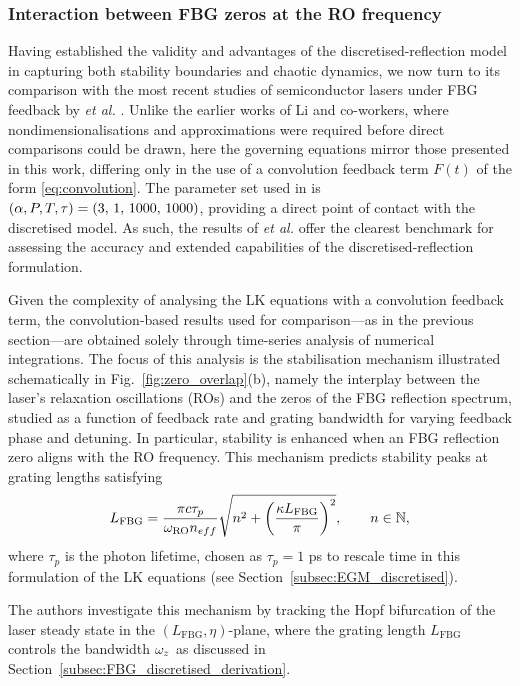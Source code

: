 \subsubsection{Interaction between FBG zeros at the RO frequency}
\label{subsubsec:skenderas}
%
Having established the validity and advantages of the discretised-reflection model in capturing both stability boundaries and chaotic dynamics, we now turn to its comparison with the most recent studies of semiconductor lasers under FBG feedback by \Skenderas \textit{et al.} \cite{skenderas2021feedback,skenderas2024impact}.
Unlike the earlier works of Li and co-workers, where nondimensionalisations and approximations were required before direct comparisons could be drawn, here the governing equations mirror those presented in this work, differing only in the use of a convolution feedback term $F(t)$ of the form \eqref{eq:convolution}.
The parameter set used in \cite{skenderas2021feedback,skenderas2024impact} is $(\alpha, P, T, \tau) = (3,\,1,\,1000,\,1000)$, providing a direct point of contact with the discretised model.
As such, the results of \Skenderas \textit{et al.} offer the clearest benchmark for assessing the accuracy and extended capabilities of the discretised-reflection formulation.
%
\par
%
Given the complexity of analysing the LK equations with a convolution feedback term, the convolution-based results used for comparison—as in the previous section—are obtained solely through time-series analysis of numerical integrations.
The focus of this analysis is the stabilisation mechanism illustrated schematically in Fig.~\ref{fig:zero_overlap}(b), namely the interplay between the laser’s relaxation oscillations (ROs) and the zeros of the FBG reflection spectrum, studied as a function of feedback rate and grating bandwidth for varying feedback phase and detuning.
In particular, stability is enhanced when an FBG reflection zero aligns with the RO frequency.
This mechanism predicts stability peaks at grating lengths satisfying \cite{skenderas2024impact}
%
\begin{equation}
    \label{eq:RO_stability}
    L_\text{FBG} = \frac{\pi c \tau_p}{\omega_\text{RO} n_{eff}} 
    \sqrt{n^2 + \left(\frac{\kappa L_\text{FBG}}{\pi}\right)^2}, 
    \qquad n \in \mathbb{N},
\end{equation}
%
where $\tau_p$ is the photon lifetime, chosen as $\tau_p = 1$ ps to rescale time in this formulation of the LK equations (see Section~\ref{subsec:EGM_discretised}).
%
\par
%
The authors investigate this mechanism by tracking the Hopf bifurcation of the laser steady state in the $(L_\text{FBG},\eta)$-plane, where the grating length $L_\text{FBG}$ controls the bandwidth $\omega_z$ as discussed in Section~\ref{subsec:FBG_discretised_derivation}.
